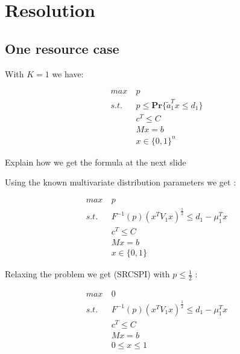 \documentclass{beamer}
\begin{document}
\section{Resolution}
\subsection{One resource case}
\begin{frame}

With $K=1$ we have:

\begin{align*}
 max\ & p\\
 s.t.\ & p \leq \mathbf{Pr} \{ \tilde{a}_1^Tx \leq d_1 \} \\
 & c^T \leq C \\
 & Mx = b \\
 & x \in \{0, 1\}^n
\end{align*}

\end{frame}

\begin{frame}
Explain how we get the formula at the next slide
\end{frame}

\begin{frame}
Using the known multivariate distribution parameters we get :

\begin{align*}
 max\ & p\\
 s.t.\ & F^{-1}(p)(x^TV_1x)^{\frac{1}{2}} \leq d_1 - \mu_1^Tx \\
 & c^T \leq C \\
 & Mx = b \\
 & x \in \{0,1\}
\end{align*}
\end{frame}

\begin{frame}
Relaxing the problem we get (SRCSPI) with $p \leq \frac{1}{2}$ :

\begin{align*}
 max\ & 0\\
 s.t.\ & F^{-1}(p)(x^TV_1x)^{\frac{1}{2}} \leq d_1 - \mu_1^Tx \\
 & c^T \leq C \\
 & Mx = b \\
 & 0 \leq x \leq 1
\end{align*}
\end{frame}
\end{document}
